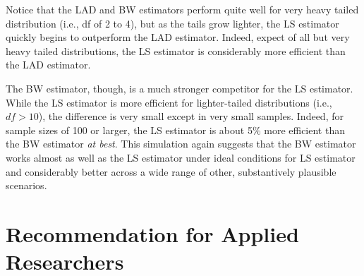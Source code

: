 \documentclass[12pt]{article}
\begin{document}
Notice that the LAD and BW estimators perform quite well for very heavy tailed distribution (i.e., df of 2 to 4), but as the tails grow lighter, the LS estimator quickly begins to outperform the LAD estimator. Indeed, expect of all but very heavy tailed distributions, the LS estimator is considerably more efficient than the LAD estimator. 

The BW estimator, though, is a much stronger competitor for the LS estimator. While the LS estimator is more efficient for lighter-tailed distributions (i.e., $df > 10$), the difference is very small except in very small samples. Indeed, for sample sizes of 100 or larger, the LS estimator is about 5\% more efficient than the BW estimator \textit{at best}. This simulation again suggests that the BW estimator works almost as well as the LS estimator under ideal conditions for LS estimator and considerably better across a wide range of other, substantively plausible scenarios.

\section*{Recommendation for Applied Researchers}
\end{document}
